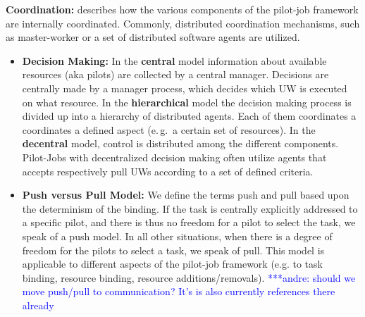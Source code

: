 \documentclass[conference,final]{IEEEtran}
\newcommand{\alnote}[1]{ {\textcolor{blue} { ***andre: #1 }}}
\newcommand{\alnote}[1]{}
\begin{document}
\textbf{Coordination:} describes how the various components of the 
pilot-job framework are internally coordinated. Commonly, 
distributed coordination mechanisms, such as master-worker or a 
set of distributed software agents are utilized.
     \begin{itemize}
     			\item \textbf{Decision Making:} In the \textbf{central} model 
				information about available resources (aka 	pilots) are 
				collected by a central manager.  Decisions are centrally 
     			made by a manager process, which decides which UW is executed on 
				what resource. In the \textbf{hierarchical} 
				model the decision making process is divided up into a hierarchy 	
				of distributed agents. Each of them coordinates a coordinates a 
				defined aspect (e.\,g.\ a certain set of resources). In the 
				\textbf{decentral} model, control is distributed among the 
     			different components. Pilot-Jobs with decentralized decision 
     			making often utilize agents that accepts respectively pull 
     			UWs according to a set of defined criteria.

				\item \textbf{Push versus Pull Model:} We define the terms push 
				and pull based upon the determinism of the binding. If
				the task is centrally explicitly addressed to a specific pilot, 
				and there is thus no freedom for a pilot to select the task, we 
				speak of a push model. In all other situations, when there is a 
				degree of freedom for the pilots to select a task, we speak of 
				pull. This model is applicable to different aspects of the 
				pilot-job framework (e.g. to task binding, resource binding, 
				resource additions/removals).    \alnote{should we move 
				push/pull to communication? It's is also currently references 
				there already}     		
     \end{itemize}
	 
\end{document}
